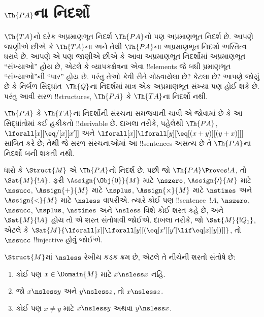 \documentclass[../../../include/open-logic-section]{subfiles}
\begin{document}
\section{$\Th{PA}$ના નિદર્શો}

\begin{explain}
$\Th{TA}$નો દરેક અપ્રમાણભૂત નિદર્શ $\Th{PA}$નો પણ અપ્રમાણભૂત નિદર્શ
છે. આપણે જાણીએ છીએ કે $\Th{TA}$ના અને તેથી $\Th{PA}$ના અપ્રમાણભૂત
નિદર્શો અસ્તિત્વ ધરાવે છે. આપણે એ પણ જાણીએ છીએ કે આવા અપ્રમાણભૂત
નિદર્શોમાં અપ્રમાણભૂત ``સંખ્યાઓ'' હોય છે, એટલે કે વ્યાપકક્ષેત્રના એવા
!!{element}s જે બધી પ્રમાણભૂત ``સંખ્યાઓ''ની ``પાર'' હોય છે. પરંતુ
તેઓ કેવી રીતે ગોઠવાયેલા છે? કેટલા છે? આપણે જોયું છે કે નિર્બળ
સિદ્ધાંત~$\Th{Q}$ના નિદર્શમાં માત્ર એક અપ્રમાણભૂત સંખ્યા પણ હોઈ શકે
છે. પરંતુ આવી સરળ !!{structure}s, $\Th{PA}$ કે $\Th{TA}$ના નિદર્શો
નથી.

$\Th{PA}$ કે $\Th{TA}$ના નિદર્શોની સંરચના સમજવાની ચાવી એ જોવામાં છે
કે આ સિદ્ધાંતોમાં કઈ હકીકતો !!{derivable} છે. દાખલા તરીકે, પહેલેથી
$\Th{PA}$, $\lforall[x][\eq/[x][x']]$ અને
$\lforall[x][\lforall[y][\eq[(x+y)][(y+x)]]]$ સાબિત કરે છે; તેથી જે
સરળ સંરચનાઓમાં આ !!{sentence}s અસત્ય છે તે $\Th{PA}$ના નિદર્શો બની
શકતી નથી.

ધારો કે $\Struct{M}$ એ $\Th{PA}$નો નિદર્શ છે. પછી જો
$\Th{PA}\Proves !A$, તો $\Sat{M}{!A}$. ફરી
$\Assign{\Obj{0}}{M}$ માટે $\nszero$, $\Assign{\prime}{M}$ માટે
$\nssucc$, $\Assign{+}{M}$ માટે $\nsplus$,
$\Assign{\times}{M}$ માટે $\nstimes$ અને $\Assign{<}{M}$ માટે
$\nsless$ વાપરીએ. ત્યારે કોઈ પણ !!{sentence}~$!A$, $\nszero$,
$\nssucc$, $\nsplus$, $\nstimes$ અને $\nsless$ વિશે કોઈ શરત કહે છે,
અને $\Sat{M}{!A}$ હોય તો એ શરત સંતોષાવી જોઈએ. દાખલા તરીકે, જો
$\Sat{M}{!Q_1}$, એટલે કે
$\Sat{M}{\lforall[x][\lforall[y][(\eq[x'][y']\lif\eq[x][y])]]}$,
તો $\nssucc$ !!{injective} હોવું જોઈએ.
\end{explain}

\begin{prop}
$\Struct{M}$માં $\nsless$ રેખીય કડક ક્રમ છે, એટલે તે નીચેની શરતો
સંતોષે છે:
\begin{enumerate}
\item કોઈ પણ $x\in\Domain{M}$ માટે $x\nsless x$ નહિ.
\item જો $x\nsless y$ અને $y\nsless z$, તો $x\nsless z$.
\item કોઈ પણ $x\neq y$ માટે $x\nsless y$ અથવા $y\nsless x$.
\end{enumerate}
\end{prop}
\end{document}
